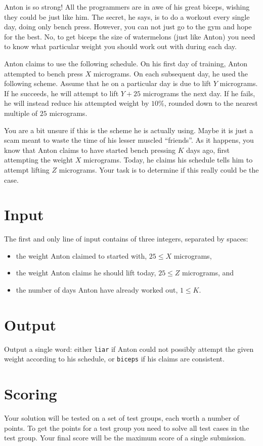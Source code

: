 Anton is so strong!
All the programmers are in awe of his great biceps, wishing they could be just like him.
The secret, he says, is to do a workout every single day, doing only bench press.
However, you can not just go to the gym and hope for the best.
No, to get biceps the size of watermelons (just like Anton) you need to know what particular weight you should work out with during each day.

Anton claims to use the following schedule.
On his first day of training, Anton attempted to bench press $X$ micrograms.
On each subsequent day, he used the following scheme.
Assume that he on a particular day is due to lift $Y$ micrograms.
If he succeeds, he will attempt to lift $Y + 25$ micrograms the next day.
If he fails, he will instead reduce his attempted weight by $10\%$, rounded down to the nearest multiple of $25$ micrograms.

You are a bit unsure if this is the scheme he is actually using.
Maybe it is just a scam meant to waste the time of his lesser muscled ``friends''.
As it happens, you know that Anton claims to have started bench pressing $K$ days ago, first attempting the weight $X$ micrograms.
Today, he claims his schedule tells him to attempt lifting $Z$ micrograms.
Your task is to determine if this really could be the case.

\section*{Input}
The first and only line of input contains of three integers, separated by spaces:
\begin{itemize}
\item the weight Anton claimed to started with, $25 \le X$ micrograms,
\item the weight Anton claims he should lift today, $25 \le Z$ micrograms, and
\item the number of days Anton have already worked out, $1 \le K$.
\end{itemize}

\section*{Output}
Output a single word: either \texttt{liar} if Anton could not possibly attempt the given weight according to his schedule, or \texttt{biceps} if his claims are consistent.

\section*{Scoring}
Your solution will be tested on a set of test groups, each worth a number of points.
To get the points for a test group you need to solve all test cases in the test group.
Your final score will be the maximum score of a single submission.

